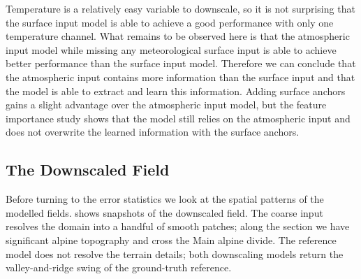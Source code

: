Temperature is a relatively easy variable to downscale, so it is not surprising that the surface input model is able to achieve a good performance with only one temperature channel. What remains to be observed here is that the atmospheric input model while missing any meteorological surface input is able to achieve better performance than the surface input model. Therefore we can conclude that the atmospheric input contains more information than the surface input and that the model is able to extract and learn this information. Adding surface anchors gains a slight advantage over the atmospheric input model, but the feature importance study shows that the model still relies on the atmospheric input and does not overwrite the learned information with the surface anchors. 



\subsection{The Downscaled Field}\label{subsec:single-tmax-field}

Before turning to the error statistics we look at the spatial patterns of the modelled fields.  shows snapshots of the downscaled field. The coarse input resolves the domain into a handful of smooth patches; along the section we have significant alpine topography and cross the Main alpine divide. The reference model does not resolve the terrain details; both downscaling models return the valley-and-ridge swing of the ground-truth reference.

